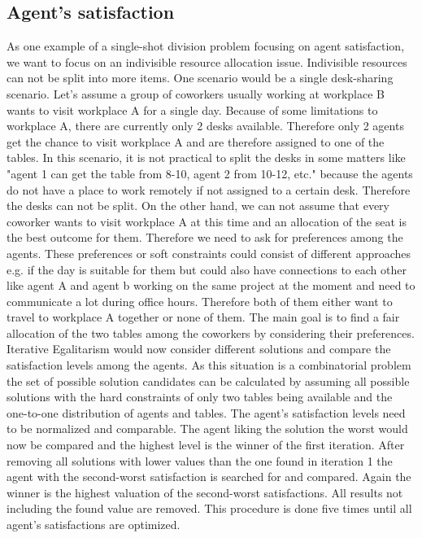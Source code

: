 \documentclass[german, a4paper, 11pt, oneside]{scrbook}
\begin{document}
\subsection{Agent's satisfaction}
As one example of a single-shot division problem focusing on agent satisfaction, we want to focus on an indivisible resource allocation issue.
Indivisible resources can not be split into more items. One scenario would be a single desk-sharing scenario. Let's assume a group of coworkers usually working at workplace B wants to visit workplace A for a single day. Because of some limitations to workplace A, there are currently only 2 desks available. Therefore only 2 agents get the chance to visit workplace A and are therefore assigned to one of the tables. In this scenario, it is not practical to split the desks in some matters like "agent 1 can get the table from 8-10, agent 2 from 10-12, etc." because the agents do not have a place to work remotely if not assigned to a certain desk. Therefore the desks can not be split. On the other hand, we can not assume that every coworker wants to visit workplace A at this time and an allocation of the seat is the best outcome for them. Therefore we need to ask for preferences among the agents. These preferences or soft constraints could consist of different approaches e.g. if the day is suitable for them but could also have connections to each other like agent A and agent b working on the same project at the moment and need to communicate a lot during office hours. Therefore both of them either want to travel to workplace A together or none of them. The main goal is to find a fair allocation of the two tables among the coworkers by considering their preferences.
\\Iterative Egalitarism would now consider different solutions and compare the satisfaction levels among the agents. As this situation is a combinatorial problem the set of possible solution candidates can be calculated by assuming all possible solutions with the hard constraints of only two tables being available and the one-to-one distribution of agents and tables. The agent's satisfaction levels need to be normalized and comparable. The agent liking the solution the worst would now be compared and the highest level is the winner of the first iteration. After removing all solutions with lower values than the one found in iteration 1 the agent with the second-worst satisfaction is searched for and compared. Again the winner is the highest valuation of the second-worst satisfactions. All results not including the found value are removed. This procedure is done five times until all agent's satisfactions are optimized. 
\end{document}
